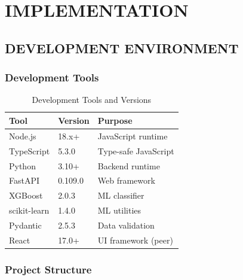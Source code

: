 
\chapter{IMPLEMENTATION}

\section{DEVELOPMENT ENVIRONMENT}

\subsection{Development Tools}

\begin{table}[H]
\centering
\caption{Development Tools and Versions}
\label{tab:dev_tools}
\begin{tabular}{|l|l|l|}
\hline
\textbf{Tool} & \textbf{Version} & \textbf{Purpose} \\
\hline
Node.js & 18.x+ & JavaScript runtime \\
\hline
TypeScript & 5.3.0 & Type-safe JavaScript \\
\hline
Python & 3.10+ & Backend runtime \\
\hline
FastAPI & 0.109.0 & Web framework \\
\hline
XGBoost & 2.0.3 & ML classifier \\
\hline
scikit-learn & 1.4.0 & ML utilities \\
\hline
Pydantic & 2.5.3 & Data validation \\
\hline
React & 17.0+ & UI framework (peer) \\
\hline
\end{tabular}
\end{table}

\subsection{Project Structure}

